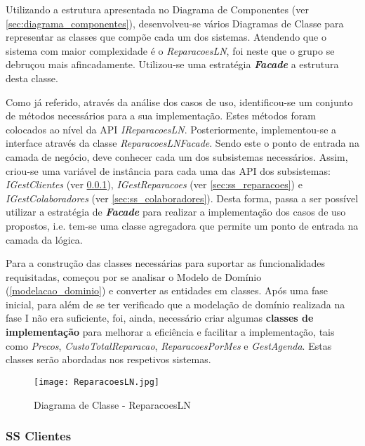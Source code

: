 \documentclass[../../relatorio.tex]{subfiles}
\begin{document}
Utilizando a estrutura apresentada no Diagrama de Componentes (ver \ref{sec:diagrama_componentes}),
desenvolveu-se vários Diagramas de Classe para representar as classes que compõe cada um dos sistemas.
Atendendo que o sistema com maior complexidade é o \textit{ReparacoesLN}, foi neste que o grupo se debruçou
mais afincadamente. Utilizou-se uma estratégia \textit{\textbf{Facade}} a estrutura desta classe.

Como já referido, através da análise dos casos de uso, identificou-se um conjunto
de métodos necessários para a sua implementação.
Estes métodos foram colocados ao nível da API \textit{IReparacoesLN}.
Posteriormente, implementou-se a interface através da classe \textit{ReparacoesLNFacade}.
Sendo este o ponto de entrada na camada de negócio, deve conhecer cada um dos subsistemas necessários.
Assim, criou-se uma variável de instância para cada uma das API dos subsistemas:
\textit{IGestClientes} (ver \ref{sec:ss_clientes}), \textit{IGestReparacoes} (ver \ref{sec:ss_reparacoes}) e
\textit{IGestColaboradores} (ver \ref{sec:ss_colaboradores}).
Desta forma, passa a ser possível utilizar a estratégia de \textit{\textbf{Facade}} para realizar a implementação
dos casos de uso propostos, i.e. tem-se uma classe agregadora que permite um ponto de entrada na camada da lógica.

Para a construção das classes necessárias para suportar as funcionalidades requisitadas,
começou por se analisar o Modelo de Domínio (\ref{modelacao_dominio}) e converter as entidades
em classes.
Após uma fase inicial, para além de se ter verificado que a modelação de domínio realizada
na fase I não era suficiente, foi, ainda, necessário criar algumas \textbf{classes de implementação}
para melhorar a eficiência e facilitar a implementação, tais como \textit{Precos}, \textit{CustoTotalReparacao},
\textit{ReparacoesPorMes} e \textit{GestAgenda}.
Estas classes serão abordadas nos respetivos sistemas.

\begin{landscape}
    \begin{figure}[!ht]
        \texttt{[image: ReparacoesLN.jpg]}
        \caption{Diagrama de Classe - ReparacoesLN}
    \end{figure}
\end{landscape}

\subsubsection{SS Clientes} \label{sec:ss_clientes}

\end{document}
